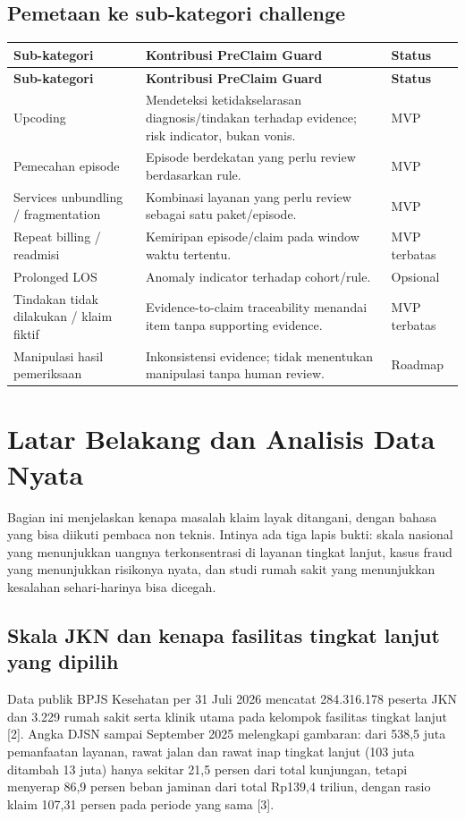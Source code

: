\documentclass[11pt,a4paper]{article}
\begin{document}
\subsection{Pemetaan ke sub-kategori challenge}
\begin{longtable}{|p{4.5cm}|p{8.2cm}|p{2.3cm}|}
\hline
\rowcolor{blue!15} \textbf{Sub-kategori} & \textbf{Kontribusi PreClaim Guard} & \textbf{Status} \\ \hline
\endfirsthead
\hline
\rowcolor{blue!15} \textbf{Sub-kategori} & \textbf{Kontribusi PreClaim Guard} & \textbf{Status} \\ \hline
\endhead
Upcoding & Mendeteksi ketidakselarasan diagnosis/tindakan terhadap evidence; risk indicator, bukan vonis. & MVP \\ \hline
Pemecahan episode & Episode berdekatan yang perlu review berdasarkan rule. & MVP \\ \hline
Services unbundling / fragmentation & Kombinasi layanan yang perlu review sebagai satu paket/episode. & MVP \\ \hline
Repeat billing / readmisi & Kemiripan episode/claim pada window waktu tertentu. & MVP terbatas \\ \hline
Prolonged LOS & Anomaly indicator terhadap cohort/rule. & Opsional \\ \hline
Tindakan tidak dilakukan / klaim fiktif & Evidence-to-claim traceability menandai item tanpa supporting evidence. & MVP terbatas \\ \hline
Manipulasi hasil pemeriksaan & Inkonsistensi evidence; tidak menentukan manipulasi tanpa human review. & Roadmap \\ \hline
\end{longtable}
\section{Latar Belakang dan Analisis Data Nyata}
Bagian ini menjelaskan kenapa masalah klaim layak ditangani, dengan bahasa yang bisa diikuti pembaca non teknis. Intinya ada tiga lapis bukti: skala nasional yang menunjukkan uangnya terkonsentrasi di layanan tingkat lanjut, kasus fraud yang menunjukkan risikonya nyata, dan studi rumah sakit yang menunjukkan kesalahan sehari-harinya bisa dicegah.

\subsection{Skala JKN dan kenapa fasilitas tingkat lanjut yang dipilih}
Data publik BPJS Kesehatan per 31 Juli 2026 mencatat 284.316.178 peserta JKN dan 3.229 rumah sakit serta klinik utama pada kelompok fasilitas tingkat lanjut [2]. Angka DJSN sampai September 2025 melengkapi gambaran: dari 538,5 juta pemanfaatan layanan, rawat jalan dan rawat inap tingkat lanjut (103 juta ditambah 13 juta) hanya sekitar 21,5 persen dari total kunjungan, tetapi menyerap 86,9 persen beban jaminan dari total Rp139,4 triliun, dengan rasio klaim 107,31 persen pada periode yang sama [3].
\end{document}
